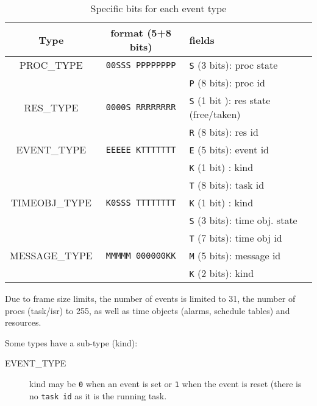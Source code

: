 \begin{table}[htbp]
	\begin{longtable}[c]{c|c|l}
		\bf Type & \bf format (5+8 bits) & \bf fields \\ \hline
		PROC\_TYPE    & \texttt{00SSS PPPPPPPP} & \texttt{S} (3 bits): proc state      \\
		              &                         & \texttt{P} (8 bits): proc id         \\ \hline
		RES\_TYPE     & \texttt{0000S RRRRRRRR} & \texttt{S} (1 bit ): res state (free/taken)       \\
		              &                         & \texttt{R} (8 bits): res id          \\ \hline
		EVENT\_TYPE   & \texttt{EEEEE KTTTTTTT} & \texttt{E} (5 bits): event id        \\
		              &                         & \texttt{K} (1 bit) : kind            \\ 
		              &                         & \texttt{T} (8 bits): task id         \\ \hline
		TIMEOBJ\_TYPE & \texttt{K0SSS TTTTTTTT} & \texttt{K} (1 bit) : kind            \\
		              &                         & \texttt{S} (3 bits): time obj. state \\
		              &                         & \texttt{T} (7 bits): time obj id     \\ \hline
		MESSAGE\_TYPE & \texttt{MMMMM 000000KK} & \texttt{M} (5 bits): message id      \\
	                  &                         & \texttt{K} (2 bits): kind            \\ \hline
	\end{longtable}
	\caption{Specific bits for each event type}
	\label{tab:traceBin}
\end{table}


Due to frame size limits, the number of events is limited to 31, the number of procs (task/isr) to 255, as well as time objects (alarms, schedule tables) and resources.

Some types have a sub-type (kind):
\begin{description}
	\item[EVENT\_TYPE] kind may be \texttt{0} when an event is set or \texttt{1} when the event is reset (there is no \texttt{task id} as it is the running task. 
\end{description}

